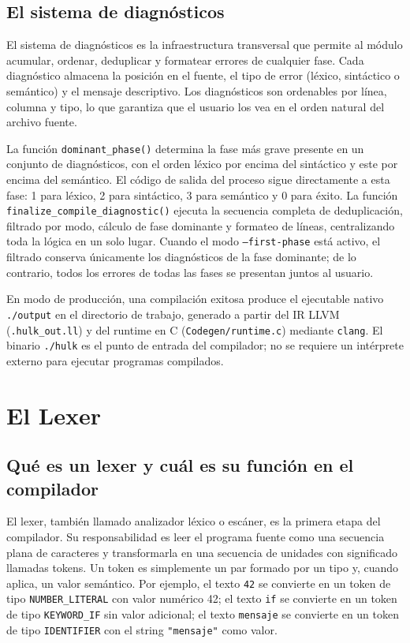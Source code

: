 \documentclass[11pt,a4paper]{article}
\begin{document}
\subsection{El sistema de diagnósticos}

El sistema de diagnósticos es la infraestructura transversal que permite al módulo acumular, ordenar, deduplicar y formatear errores de cualquier fase. Cada diagnóstico almacena la posición en el fuente, el tipo de error (léxico, sintáctico o semántico) y el mensaje descriptivo. Los diagnósticos son ordenables por línea, columna y tipo, lo que garantiza que el usuario los vea en el orden natural del archivo fuente.

La función \texttt{dominant\_phase()} determina la fase más grave presente en un conjunto de diagnósticos, con el orden léxico por encima del sintáctico y este por encima del semántico. El código de salida del proceso sigue directamente a esta fase: 1 para léxico, 2 para sintáctico, 3 para semántico y 0 para éxito. La función \texttt{finalize\_compile\_diagnostic()} ejecuta la secuencia completa de deduplicación, filtrado por modo, cálculo de fase dominante y formateo de líneas, centralizando toda la lógica en un solo lugar. Cuando el modo \texttt{--first-phase} está activo, el filtrado conserva únicamente los diagnósticos de la fase dominante; de lo contrario, todos los errores de todas las fases se presentan juntos al usuario.

En modo de producción, una compilación exitosa produce el ejecutable nativo \texttt{./output} en el directorio de trabajo, generado a partir del IR LLVM (\texttt{.hulk\_out.ll}) y del runtime en C (\texttt{Codegen/runtime.c}) mediante \texttt{clang}. El binario \texttt{./hulk} es el punto de entrada del compilador; no se requiere un intérprete externo para ejecutar programas compilados.

\section{El Lexer}

\subsection{Qué es un lexer y cuál es su función en el compilador}

El lexer, también llamado analizador léxico o escáner, es la primera etapa del compilador. Su responsabilidad es leer el programa fuente como una secuencia plana de caracteres y transformarla en una secuencia de unidades con significado llamadas tokens. Un token es simplemente un par formado por un tipo y, cuando aplica, un valor semántico. Por ejemplo, el texto \texttt{42} se convierte en un token de tipo \texttt{NUMBER\_LITERAL} con valor numérico 42; el texto \texttt{if} se convierte en un token de tipo \texttt{KEYWORD\_IF} sin valor adicional; el texto \texttt{mensaje} se convierte en un token de tipo \texttt{IDENTIFIER} con el string \texttt{"mensaje"} como valor.
\end{document}
